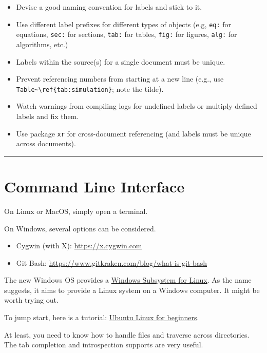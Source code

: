 \documentclass[
]{book}
\providecommand{\tightlist}{%
  \setlength{\itemsep}{0pt}\setlength{\parskip}{0pt}}
\theoremstyle{definition}
\theoremstyle{definition}
\theoremstyle{definition}
\theoremstyle{definition}
\theoremstyle{remark}
\begin{document}
\begin{itemize}
\tightlist
\item
  Devise a good naming convention for labels and stick to it.
\item
  Use different label prefixes for different types of objects (e.g, \texttt{eq:} for
  equations, \texttt{sec:} for sections, \texttt{tab:} for tables, \texttt{fig:} for figures, \texttt{alg:}
  for algorithms, etc.)
\item
  Labels within the source(s) for a single document must be unique.
\item
  Prevent referencing numbers from starting at a new line (e.g., use
  \texttt{Table\textasciitilde{}\textbackslash{}ref\{tab:simulation\}}; note the tilde).
\item
  Watch warnings from compiling logs for undefined labels or multiply defined
  labels and fix them.
\item
  Use package \texttt{xr} for cross-document referencing (and labels must be unique
  across documents).
\end{itemize}

\begin{center}\rule{0.5\linewidth}{0.5pt}\end{center}

\section{Command Line Interface}\label{command-line-interface}

On Linux or MacOS, simply open a terminal.

On Windows, several options can be considered.

\begin{itemize}
\tightlist
\item
  Cygwin (with X): \url{https://x.cygwin.com}
\item
  Git Bash: \url{https://www.gitkraken.com/blog/what-is-git-bash}
\end{itemize}

The new Windows OS provides a \href{https://learn.microsoft.com/en-us/windows/wsl/install}{Windows Subsystem for
Linux}. As the name
suggests, it aims to provide a Linux system on a Windows computer. It might be
worth trying out.

To jump start, here is a tutorial:
\href{https://ubuntu.com/tutorials/command-line-for-beginners}{Ubuntu Linux for beginners}.

At least, you need to know how to handle files and traverse across
directories. The tab completion and introspection supports are very useful.
\end{document}
